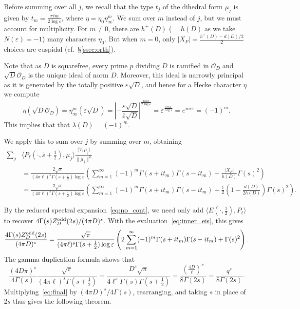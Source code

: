 \documentclass[11pt,reqno,oneside]{amsart}
\theoremstyle{plain}
\theoremstyle{definition}
\newcommand{\calO}{\mathcal{O}}
\newcommand{\Zodd}{Z_D^{\textup{odd}}}
\begin{document}
Before summing over all $j$, we recall that the type $t_j$ of the dihedral form
$\mu_j$ is given by $t_m = \tfrac{\pi i m}{2 \log \varepsilon}$,
where $\eta = \eta_0 \eta_\infty^m$.
We sum over $m$ instead of $j$, but we must account for multiplicity.
For $m \neq 0$, there are $h^+(D)$ ($= h(D)$ as we take $N(\varepsilon) = -1$)
many characters $\eta_0$.
But when $m = 0$, only $\lvert X_F \rvert = \frac{h^+(D) - d(D)/2}{2}$ choices
are cuspidal (cf.\ \S\ref{ssec:orth}).

Note that as $D$ is squarefree, every prime $p$ dividing $D$ is ramified in
$\calO_D$ and $\sqrt{D}\calO_D$ is the unique ideal of norm $D$.
Moreover, this ideal is narrowly principal as it is generated by the totally
positive $\varepsilon \sqrt{D}$, and hence for a Hecke character $\eta$ we
compute
\begin{equation}\label{eq:eigenvalue_sqrtD}
  \eta(\sqrt{D} \calO_D)
  =
  \eta_{\infty}^m(\varepsilon \sqrt{D})
  =
  \left \lvert
  - \frac{\varepsilon \sqrt{D}}{\overline{\varepsilon} \sqrt{D}}
  \right \rvert^{\frac{i m \pi}{2 \log \varepsilon}}
  = \varepsilon^{\frac{i m \pi}{\log \varepsilon}} = e^{i m \pi} = (-1)^m.
\end{equation}
This implies that that $\lambda(D) = (-1)^m$.

We apply this to sum over $j$ by summing over $m$, obtaining
\begin{align*}
  \sum_j & \langle P_\ell(\cdot, \overline{s}+\tfrac{1}{2}), \mu_j \rangle
  \frac{\langle V, \mu_j \rangle}{\lVert \mu_j \rVert^2}
  \\
         & = \frac{2 \sqrt{\pi}}{(4 \pi \ell)^s \Gamma(s + \frac{1}{2}) \log \varepsilon}
  \left( \sum_{m = 1}^{\infty}(-1)^m \Gamma(s + it_m)\Gamma(s-it_m)
  + \frac{\lvert X_F \rvert}{h(D)} \Gamma(s)^2 \right)
  \\
         & =
  \frac{2 \sqrt{\pi}}{(4 \pi \ell)^s \Gamma(s + \frac{1}{2}) \log \varepsilon}
  \left( \sum_{m = 1}^{\infty}(-1)^m \Gamma(s + it_m)\Gamma(s-it_m)
  + \frac{1}{2}\left(1 - \frac{d(D)}{2h(D)} \right) \Gamma(s)^2 \right).
\end{align*}

By the reduced spectral expansion~\eqref{eq:no_cont}, we need only add $\langle
  E(\cdot, \tfrac{1}{2}), P_\ell \rangle$ to recover $4 \Gamma(s) \Zodd(2s)/ (4\pi D)^s$.
With the evaluation~\eqref{eq:inner_eis}, this gives
\begin{equation}\label{eq:final}
  \frac{4 \Gamma(s) \Zodd(2s)}{(4\pi D)^s}
  =
  \frac{\sqrt{\pi}}{(4 \pi \ell)^s \Gamma(s + \frac{1}{2}) \log \varepsilon}
  \left( 2\sum_{m = 1}^{\infty}(-1)^m \Gamma(s + it_m)\Gamma(s-it_m)
  + \Gamma(s)^2 \right).
\end{equation}
The gamma duplication formula
shows that
\begin{equation}
  \frac{(4D\pi)^s}{4 \Gamma(s)}
  \frac{\sqrt{\pi}}{(4 \pi \ell)^s \Gamma(s + \frac{1}{2})}
  = \frac{D^s \sqrt{\pi}}{4 \ell^s \Gamma(s) \Gamma(s+\tfrac{1}{2})}
  = \frac{\left(\frac{4D}{\ell}\right)^s}{8 \Gamma(2s)} = \frac{q^s}{8 \Gamma(2s)}.
\end{equation}
Multiplying~\eqref{eq:final} by $(4 \pi D)^s/4\Gamma(s)$, rearranging, and
taking $s$ in place of $2s$ thus gives the following theorem.
\end{document}
